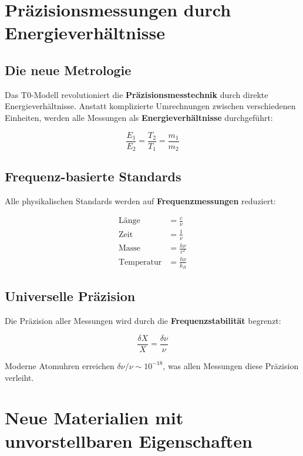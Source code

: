 \documentclass[12pt,a4paper]{report}
\begin{document}
	\section{Präzisionsmessungen durch Energieverhältnisse}
	
	\subsection{Die neue Metrologie}
	
	Das T0-Modell revolutioniert die \textbf{Präzisionsmesstechnik} durch direkte Energieverhältnisse. Anstatt komplizierte Umrechnungen zwischen verschiedenen Einheiten, werden alle Messungen als \textbf{Energieverhältnisse} durchgeführt:
	
	\begin{equation}
		\frac{E_1}{E_2} = \frac{T_2}{T_1} = \frac{m_1}{m_2}
	\end{equation}
	
	\subsection{Frequenz-basierte Standards}
	
	Alle physikalischen Standards werden auf \textbf{Frequenzmessungen} reduziert:
	
	\begin{align}
		\text{Länge} &= \frac{c}{\nu} \\
		\text{Zeit} &= \frac{1}{\nu} \\
		\text{Masse} &= \frac{h\nu}{c^2} \\
		\text{Temperatur} &= \frac{h\nu}{k_B}
	\end{align}
	
	\subsection{Universelle Präzision}
	
	Die Präzision aller Messungen wird durch die \textbf{Frequenzstabilität} begrenzt:
	
	\begin{equation}
		\frac{\delta X}{X} = \frac{\delta\nu}{\nu}
	\end{equation}
	
	Moderne Atomuhren erreichen $\delta\nu/\nu \sim 10^{-18}$, was allen Messungen diese Präzision verleiht.
	
	\section{Neue Materialien mit unvorstellbaren Eigenschaften}
	
\end{document}
